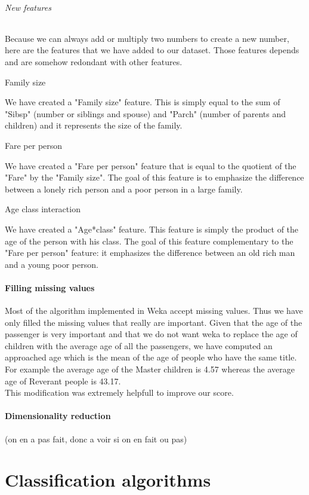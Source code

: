 \documentclass[11pt,a4paper,portrait]{article}
\begin{document}
\paragraph{New features}
Because we can always add or multiply two numbers to create a new number, here are the features that we have added to our dataset. Those features depends and are somehow redondant with other features.

\subparagraph{Family size}
We have created a "Family size" feature. This is simply equal to the sum of "Sibsp" (number or siblings and spouse) and "Parch" (number of parents and children) and it represents the size of the family.

\subparagraph{Fare per person}
We have created a "Fare per person" feature that is equal to the quotient of the "Fare" by the "Family size". The goal of this feature is to emphasize the difference between a lonely rich person and a poor person in a large family.

\subparagraph{Age class interaction}
We have created a "Age*class" feature. This feature is simply the product of the age of the person with his class. The goal of this feature complementary to the "Fare per person" feature: it emphasizes the difference between an old rich man and a young poor person.


\subsection{Filling missing values}
Most of the algorithm implemented in Weka accept missing values. Thus we have only filled the missing values that really are important. Given that the age of the passenger is very important and that we do not want weka to replace the age of children with the average age of all the passengers, we have computed an approached age which is the mean of the age of people who have the same title. For example the average age of the Master children is 4.57 whereas the average age of Reverant people is 43.17.\\
This modification was extremely helpfull to improve our score.

\subsection{Dimensionality reduction}
(on en a pas fait, donc a voir si on en fait ou pas)

\part{Classification algorithms}
\setcounter{section}{0}
\end{document}
